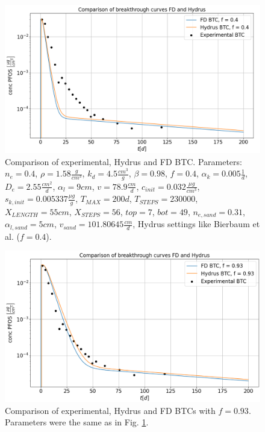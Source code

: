 \begin{figure}
	\centering
	\includegraphics[scale=0.43]{images/hyd_pde_exp_0.4.png}
\caption[Comparison of experimental, Hydrus and FD BTCs, $f=0.4$]{Comparison of experimental, Hydrus and FD BTC. Parameters: $n_e = 0.4$, $\rho = 1.58 \frac{g}{cm^3}$, $k_d = 4.5 \frac{cm^3}{g}$, $\beta = 0.98$, $f = 0.4$, $\alpha_k = 0.005 \frac{1}{d}$, $D_e = 2.55\frac{cm^2}{d}$, $\alpha_l = 9cm$, $v=78.9\frac{cm}{d}$, $c_{init} = 0.032\frac{\mu g}{cm^3}$, $s_{k, init} = 0.005337 \frac{\mu g}{g}$, $T_{MAX} = 200d$, $T_{STEPS} = 230000$, $X_{LENGTH} = 55cm$, $X_{STEPS} = 56$, $top = 7$, $bot = 49$, $n_{e,sand} = 0.31$, $\alpha_{l,sand} = 5cm$, $v_{sand} = 101.80645 \frac{cm}{d}$, Hydrus settings like Bierbaum et al. ($f = 0.4$).}
\label{fig:hyd_pde_exp_0.4}
\end{figure}
\begin{figure}
	\centering
	\includegraphics[scale=0.5]{images/hyd_pde_exp_0.93.png}
\caption[Comparison of experimental, Hydrus and FD BTCs, $f=0.93$]{Comparison of experimental, Hydrus and FD BTCs with $f=0.93$. Parameters were the same as in Fig. \ref{fig:hyd_pde_exp_0.4}.}
\label{fig:hyd_pde_exp_0.93}
\end{figure}
